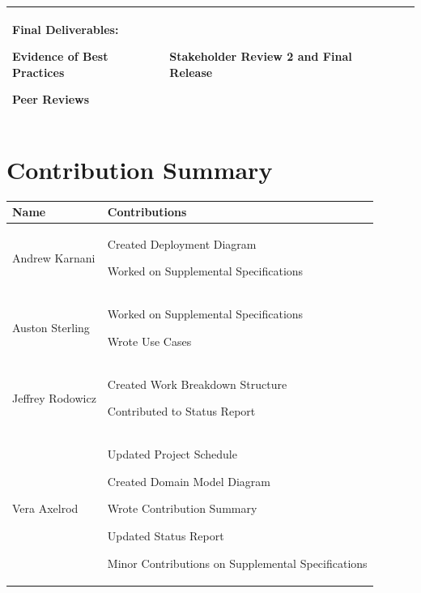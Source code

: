 \documentclass[11pt]{article}
\newcounter{id}
\newenvironment{packed_itemize}{
\begin{itemize}
  \setlength{\itemsep}{1pt}
  \setlength{\parskip}{0pt}
  \setlength{\parsep}{0pt}
}{\end{itemize}}
\begin{document}
\begin{tabular}{|m{0.9in}|m{0.9in}|m{4in}|m{.8in}|}
Final Deliverables:
	\begin{packed_itemize}
	\vspace{-0.15in}
		\item Evidence of Best Practices
		\item Peer Reviews
	\vspace{-0.15in}
	\end{packed_itemize}
&
Stakeholder Review 2 and Final Release \\
\hline
\end{tabular}


\section{Contribution Summary}

\begin{tabular}{|m{1.4in}|m{4in}|}
\hline
\textbf{\large Name}     & \textbf{\large Contributions} \\
\hline\hline
 Andrew Karnani
	&
	 \begin{packed_itemize}
		\item Created Deployment Diagram
		\item Worked on Supplemental Specifications
	\end{packed_itemize}
\\
\hline
 Auston Sterling
	&
	 \begin{packed_itemize}
	        \item Worked on Supplemental Specifications
		\item Wrote Use Cases
	\end{packed_itemize}
\\
\hline
Jeffrey Rodowicz
	&
	 \begin{packed_itemize}
		\item Created Work Breakdown Structure
		\item Contributed to Status Report
	\end{packed_itemize}
\\
\hline
Vera Axelrod
	&
	 \begin{packed_itemize}
		 \item Updated Project Schedule
		\item Created Domain Model Diagram
		\item Wrote Contribution Summary
		\item Updated Status Report
		\item Minor Contributions on Supplemental Specifications
	\end{packed_itemize}
\\
\hline
\end{tabular}
\end{document}
